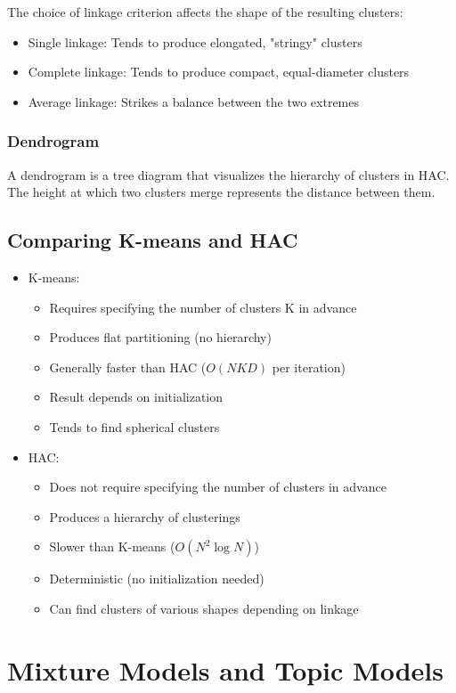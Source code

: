 \documentclass{article}
\begin{document}
The choice of linkage criterion affects the shape of the resulting clusters:
\begin{itemize}
\item Single linkage: Tends to produce elongated, "stringy" clusters
\item Complete linkage: Tends to produce compact, equal-diameter clusters
\item Average linkage: Strikes a balance between the two extremes
\end{itemize}

\subsubsection{Dendrogram}
A dendrogram is a tree diagram that visualizes the hierarchy of clusters in HAC. The height at which two clusters merge represents the distance between them.

\subsection{Comparing K-means and HAC}
\begin{itemize}
\item K-means:
  \begin{itemize}
  \item Requires specifying the number of clusters K in advance
  \item Produces flat partitioning (no hierarchy)
  \item Generally faster than HAC ($O(NKD)$ per iteration)
  \item Result depends on initialization
  \item Tends to find spherical clusters
  \end{itemize}
\item HAC:
  \begin{itemize}
  \item Does not require specifying the number of clusters in advance
  \item Produces a hierarchy of clusterings
  \item Slower than K-means ($O(N^2\log N)$)
  \item Deterministic (no initialization needed)
  \item Can find clusters of various shapes depending on linkage
  \end{itemize}
\end{itemize}

\section{Mixture Models and Topic Models}
\end{document}
